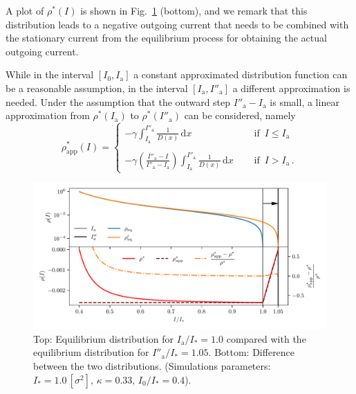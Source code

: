 A plot of $\rho^\ast(I)$ is shown in Fig.~\ref{fig:6} (bottom), and we remark that this distribution leads to a negative outgoing current that needs to be combined with the stationary current from the equilibrium process for obtaining the actual outgoing current.

While in the interval $[I_0, I_\mathrm{a}]$ a constant approximated distribution function can be a reasonable assumption, in the interval $[I_\mathrm{a}, I''_\mathrm{a}]$ a different approximation is needed. Under the assumption that the outward step $I''_\mathrm{a} - I_\mathrm{a}$ is small, a linear approximation from $\rho^\ast(I_\mathrm{a})$ to $\rho^\ast(I''_\mathrm{a})$ can be considered, namely
\begin{equation}
    \rho^\ast_\text{app}(I) = 
    \left\{\begin{array}{lr}
        - \gamma \displaystyle{\int_{I_\mathrm{a}}^{I''_\mathrm{a}} \frac{1}{D(x)}\,\mathrm{d}x} \quad &\text{  if } \, I \leq I_\mathrm{a}\\
        \\
        - \gamma \displaystyle{\left(\frac{I''_\mathrm{a} - I}{I''_\mathrm{a} - I_\mathrm{a}} \right)} \displaystyle{\int_{I_\mathrm{a}}^{I''_\mathrm{a}} \frac{1}{D(x)}\,\mathrm{d}x} \quad &\text{  if } \, I > I_\mathrm{a} \,.
    \end{array}\right. 
    \label{eq:outward_difference_approx}
\end{equation} 

\begin{figure}[htp]
    \centering
    \includegraphics[width=\textwidth]{4_probing_the_diffusive_behavior/figs/final/difference_outwards_s.pdf}
    \caption{Top: Equilibrium distribution for $I_\mathrm{a}/I_\ast = 1.0$ compared with the equilibrium distribution for $I''_\mathrm{a}/I_\ast = 1.05$. Bottom: Difference between the two distributions. (Simulations parameters: $I_\ast = 1.0\,[\sigma^2],\, \kappa = 0.33,\, I_0/I_\ast = 0.4$).}
    \label{fig:6}
\end{figure}

